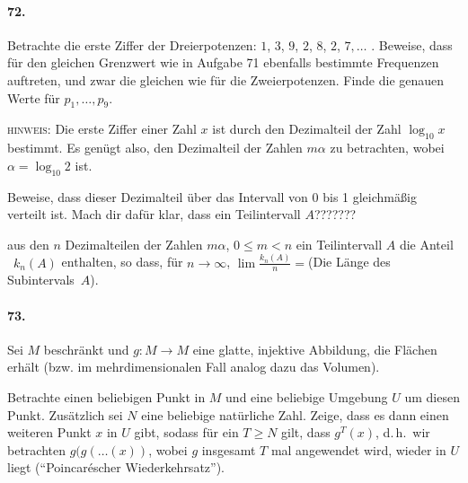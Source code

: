 \documentclass[10pt,a5paper,twoside]{article}
\newenvironment{problem}[1]{\paragraph*{#1}}{}
\begin{document}
\begin{problem}{72.}
	Betrachte die erste Ziffer der Dreierpotenzen: $1$,
	$3$, $9$, $2$, $8$, $2$, $7, \dots$ . Beweise, dass für den gleichen Grenzwert wie in Aufgabe 71 ebenfalls bestimmte Frequenzen auftreten, und zwar die gleichen wie für die Zweierpotenzen. Finde die genauen Werte für $p_1, \dots, p_9$.

	\noindent\textsc{hinweis:} Die erste Ziffer einer Zahl $x$ ist durch den Dezimalteil der Zahl 
	$\log_{10} x$ bestimmt. Es genügt also, den Dezimalteil der Zahlen $m \alpha$ zu betrachten, wobei $\alpha=\log_{10} 2$ ist.

	Beweise, dass dieser Dezimalteil über das Intervall von 0 bis 1 gleichmäßig verteilt ist. Mach dir dafür klar, dass ein Teilintervall $A$???????

	aus den $n$ Dezimalteilen der Zahlen $m \alpha$, $0 \leqslant m<n$ ein Teilintervall $A$  die Anteil ~$k_n (A)$ enthalten, so dass, für $n \to \infty$,
	$\lim \frac{k_n (A)}{n}={}$(Die Länge des Subintervals~$A$).
\end{problem}

\begin{problem}{73.}
	Sei $M$ beschränkt und $g\colon M \to M$ eine glatte, injektive Abbildung, die Flächen erhält (bzw. im mehrdimensionalen Fall analog dazu das Volumen). 

	 
	Betrachte einen beliebigen Punkt in $M$ und eine beliebige Umgebung $U$ um diesen Punkt. Zusätzlich sei $N$ eine beliebige natürliche Zahl. 
	Zeige, dass es dann einen weiteren Punkt $x$ in $U$ gibt, sodass für ein $T\geq N$ gilt, dass $g^T (x)$, d.\,h.\ wir betrachten $g(g(\dots (x))$, wobei $g$ insgesamt $T$ mal angewendet wird, wieder in $U$ liegt (\enquote{Poincaréscher Wiederkehrsatz}).


\end{problem}
\end{document}
